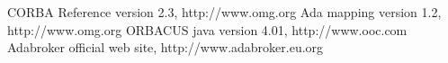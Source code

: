 \begin{thebibliography}{99}

 CORBA Reference version 2.3,
http://www.omg.org
 Ada mapping version 1.2, http://www.omg.org
 ORBACUS java version 4.01, http://www.ooc.com
\bibitem[Adabroker] Adabroker official web site, http://www.adabroker.eu.org
\end{thebibliography}
